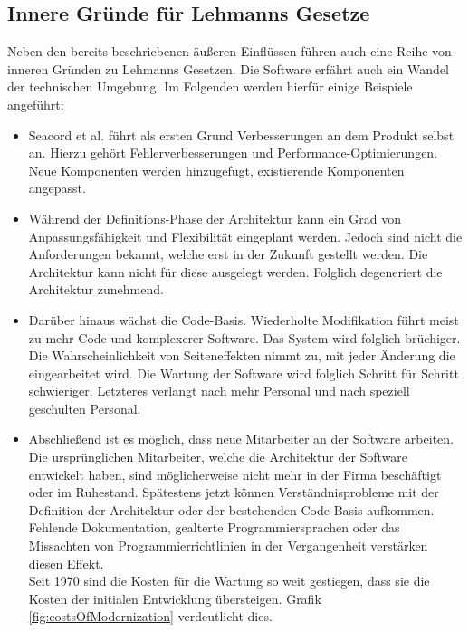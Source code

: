 \subsection{Innere Gründe für Lehmanns Gesetze}
Neben den bereits beschriebenen äußeren Einflüssen führen auch eine Reihe von inneren Gründen zu Lehmanns Gesetzen. Die Software erfährt auch ein Wandel der technischen Umgebung. Im Folgenden werden hierfür einige Beispiele angeführt:

\begin{itemize}
    \item Seacord et al. \cite{seacord_modernizing_2003} führt als ersten Grund Verbesserungen an dem Produkt selbst an. Hierzu gehört Fehlerverbesserungen und Performance-Optimierungen. Neue Komponenten werden hinzugefügt, existierende Komponenten angepasst. \cite{seacord_modernizing_2003}
    \item Während der Definitions-Phase der Architektur kann ein Grad von Anpassungsfähigkeit und Flexibilität eingeplant werden. Jedoch sind nicht die Anforderungen bekannt, welche erst in der Zukunft gestellt werden. Die Architektur kann nicht für diese ausgelegt werden. Folglich degeneriert die Architektur zunehmend.\cite{seacord_modernizing_2003}\cite{daniel_kramer_legacy-software_2020}
    \item Darüber hinaus wächst die Code-Basis. Wiederholte Modifikation führt meist zu mehr Code und komplexerer Software. Das System wird folglich brüchiger. Die Wahrscheinlichkeit von Seiteneffekten nimmt zu, mit jeder Änderung die eingearbeitet wird. Die Wartung der Software wird folglich Schritt für Schritt schwieriger. Letzteres verlangt nach mehr Personal und nach speziell geschulten Personal. \cite{seacord_modernizing_2003}\cite{daniel_kramer_legacy-software_2020}
    \item Abschließend ist es möglich, dass neue Mitarbeiter an der Software arbeiten. Die ursprünglichen Mitarbeiter, welche die Architektur der Software entwickelt haben, sind möglicherweise nicht mehr in der Firma beschäftigt oder im Ruhestand. Spätestens jetzt können Verständnisprobleme mit der Definition der Architektur oder der bestehenden Code-Basis aufkommen.\\
    Fehlende Dokumentation, gealterte Programmiersprachen oder das Missachten von Programmierrichtlinien in der Vergangenheit verstärken diesen Effekt. \\ 
    Seit 1970 sind die Kosten für die Wartung so weit gestiegen, dass sie die Kosten der initialen Entwicklung übersteigen. Grafik \ref{fig:costsOfModernization} verdeutlicht dies.
\end{itemize}

